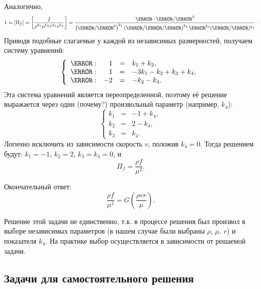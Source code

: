 \documentclass[14pt]{extarticle}
\begin{document}
Аналогично,
\[
1 =  [\Pi_f] = \left[\frac{f}{\rho^{k_1} \mu^{k_2} r^{k_3} v^{k_4}} \right] = 
\frac{\kg \cdot \m/\s^2}{ 
	\left( \kg/\m^3       \right)^{k_1}
	\left(\kg/\m/\s\right)^{k_2}
	\m^{k_3}
	(\m/\s)^{k_4}
}.
\]
Приводя подобные слагаемые у каждой из независимых размерностей, получаем систему уравнений:
\[
\left\{
\begin{array}{lrcl}
	\kg: &
	1 &  = & k_1 + k_2, \\
	\m: & 
	1 & = & -3 k_1 - k_2 + k_3 + k_4,\\
	\s: &
	-2 & = &  -k_2 - k_4.
\end{array}
\right.
\]
Эта система уравнений является переопределенной, поэтому её решение выражается через один (\alert{почему?}) произвольный параметр (например, $k_4$):
\[
\left\{
\begin{array}{rcl}
	k_1 & = & -1 + k_4,\\
	k_2 & = & 2 -k_4, \\
	k_3 & = & k_4.
\end{array}
\right.
\]
Логично исключить из зависимости скорость $v$, положив $k_4=0$. Тогда решением будут: $k_1=-1$, $k_2 = 2$, $k_3=k_4=0$, и 
\[
\Pi_f = \frac{\rho f}{\mu^2}.
\]

Окончательный ответ:
\[
\frac{\rho f}{\mu^2} = G\left(\frac{\rho v r}{\mu}\right).
\]

Решение этой задачи не единственно, т.к. в процессе решения был произвол в выборе независимых параметров (в нашем случае были выбраны $\rho$, $\mu$, $r$) и показателя $k_4$. На практике выбор осуществляется в зависимости от решаемой задачи.


\subsection{Задачи для самостоятельного решения}
\end{document}
